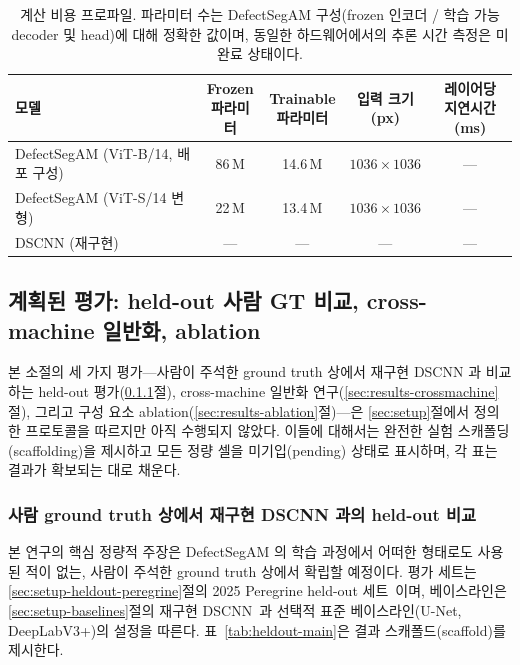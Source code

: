 \begin{table}[t]
\centering
\caption{계산 비용 프로파일. 파라미터 수는 DefectSegAM 구성(frozen 인코더
/ 학습 가능 decoder 및 head)에 대해 정확한 값이며, 동일한 하드웨어에서의
추론 시간 측정은 미완료 상태이다. }
\label{tab:efficiency}
\footnotesize
\begin{tabularx}{\textwidth}{@{}>{\raggedright\arraybackslash}Xcccc@{}}
\toprule
모델 & \makecell{Frozen\\파라미터} & \makecell{Trainable\\파라미터} & \makecell{입력 크기\\(px)} & \makecell{레이어당\\지연시간 (ms)} \\
\midrule
DefectSegAM (ViT-B/14, 배포 구성) & 86\,M & 14.6\,M & $1036 \times 1036$ & --- \\
DefectSegAM (ViT-S/14 변형)       & 22\,M & 13.4\,M & $1036 \times 1036$ & --- \\
DSCNN (재구현)~\cite{Scime2020DSCNN} & --- & --- & --- & --- \\
\bottomrule
\end{tabularx}
\end{table}

\subsection{계획된 평가: held-out 사람 GT 비교, cross-machine 일반화,
ablation}
\label{sec:results-planned}

본 소절의 세 가지 평가---사람이 주석한 ground truth 상에서 재구현
DSCNN 과 비교하는 held-out 평가(\ref{sec:results-heldout}절),
cross-machine 일반화 연구(\ref{sec:results-crossmachine}절), 그리고 구성
요소 ablation(\ref{sec:results-ablation}절)---은 \ref{sec:setup}절에서
정의한 프로토콜을 따르지만 아직 수행되지 않았다. 이들에 대해서는 완전한
실험 스캐폴딩(scaffolding)을 제시하고 모든 정량 셀을 미기입(pending)
상태로 표시하며, 각 표는 결과가 확보되는 대로 채운다.

\subsubsection{사람 ground truth 상에서 재구현 DSCNN 과의 held-out 비교}
\label{sec:results-heldout}

본 연구의 핵심 정량적 주장은 DefectSegAM 의 학습 과정에서 어떠한 형태로도
사용된 적이 없는, 사람이 주석한 ground truth 상에서 확립할 예정이다. 평가
세트는 \ref{sec:setup-heldout-peregrine}절의 2025 Peregrine held-out
세트~\cite{Peregrine_v2025_TODO}이며, 베이스라인은
\ref{sec:setup-baselines}절의 재구현 DSCNN~\cite{Scime2020DSCNN}과 선택적
표준 베이스라인(U-Net, DeepLabV3+)의 설정을 따른다.
표~\ref{tab:heldout-main}은 결과 스캐폴드(scaffold)를 제시한다.

